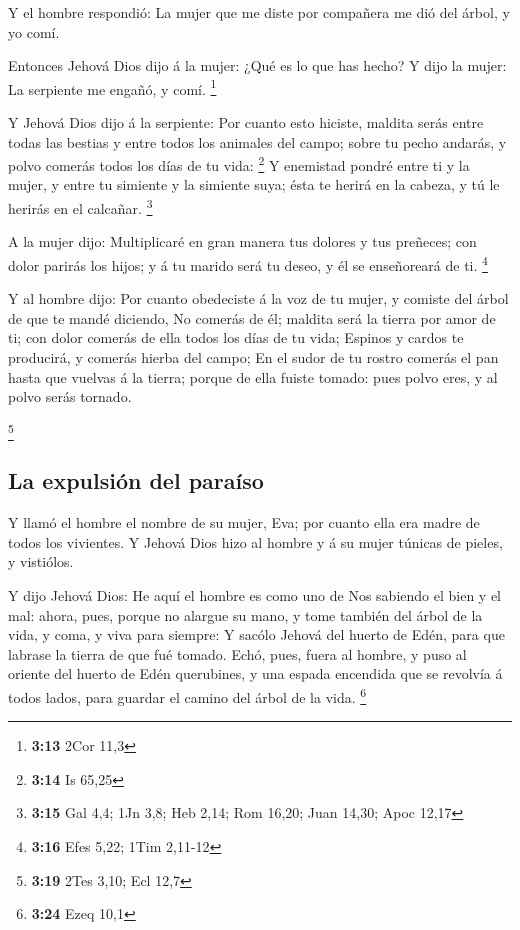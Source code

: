  Y el hombre respondió: La mujer que me diste por compañera
me dió del árbol, y yo comí.

 Entonces Jehová Dios dijo á la mujer: ¿Qué es lo que has
hecho? Y dijo la mujer: La serpiente me engañó, y comí. \footnote{\textbf{3:13}
  2Cor 11,3}

 Y Jehová Dios dijo á la serpiente: Por cuanto esto
hiciste, maldita serás entre todas las bestias y entre todos los
animales del campo; sobre tu pecho andarás, y polvo comerás todos los
días de tu vida: \footnote{\textbf{3:14} Is 65,25}  Y
enemistad pondré entre ti y la mujer, y entre tu simiente y la simiente
suya; ésta te herirá en la cabeza, y tú le herirás en el calcañar.
\footnote{\textbf{3:15} Gal 4,4; 1Jn 3,8; Heb 2,14; Rom 16,20; Juan
  14,30; Apoc 12,17}

 A la mujer dijo: Multiplicaré en gran manera tus dolores y
tus preñeces; con dolor parirás los hijos; y á tu marido será tu deseo,
y él se enseñoreará de ti. \footnote{\textbf{3:16} Efes 5,22; 1Tim
  2,11-12}

 Y al hombre dijo: Por cuanto obedeciste á la voz de tu
mujer, y comiste del árbol de que te mandé diciendo, No comerás de él;
maldita será la tierra por amor de ti; con dolor comerás de ella todos
los días de tu vida;  Espinos y cardos te producirá, y
comerás hierba del campo;  En el sudor de tu rostro comerás
el pan hasta que vuelvas á la tierra; porque de ella fuiste tomado: pues
polvo eres, y al polvo serás tornado.

\footnote{\textbf{3:19} 2Tes 3,10; Ecl 12,7}

\hypertarget{la-expulsiuxf3n-del-parauxedso}{%
\subsection{La expulsión del
paraíso}\label{la-expulsiuxf3n-del-parauxedso}}

 Y llamó el hombre el nombre de su mujer, Eva; por cuanto
ella era madre de todos los vivientes.  Y Jehová Dios hizo
al hombre y á su mujer túnicas de pieles, y vistiólos.

 Y dijo Jehová Dios: He aquí el hombre es como uno de Nos
sabiendo el bien y el mal: ahora, pues, porque no alargue su mano, y
tome también del árbol de la vida, y coma, y viva para siempre:
 Y sacólo Jehová del huerto de Edén, para que labrase la
tierra de que fué tomado.  Echó, pues, fuera al hombre, y
puso al oriente del huerto de Edén querubines, y una espada encendida
que se revolvía á todos lados, para guardar el camino del árbol de la
vida. \footnote{\textbf{3:24} Ezeq 10,1}

